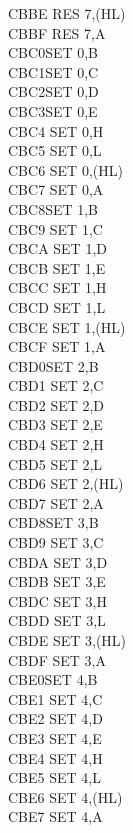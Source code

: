 \begin{multicols}{3}
{\begin{tabbing}
    CBBE\> 	RES 7,(HL)\\
    CBBF\> 	RES 7,A\\
    CBC0\>SET 0,B\\
    CBC1\>SET 0,C\\
    CBC2\>SET 0,D\\
    CBC3\>SET 0,E\\
    CBC4\> 	SET 0,H\\
    CBC5\> 	SET 0,L\\
    CBC6\> 	SET 0,(HL)\\
    CBC7\> 	SET 0,A\\
    CBC8\>SET 1,B\\
    CBC9\> 	SET 1,C\\
    CBCA\> 	SET 1,D\\
    CBCB\> 	SET 1,E\\
    CBCC\> 	SET 1,H\\
    CBCD\> 	SET 1,L\\
    CBCE\> 	SET 1,(HL)\\
    CBCF\> 	SET 1,A\\
    CBD0\>SET 2,B\\
    CBD1\> 	SET 2,C\\
    CBD2\> 	SET 2,D\\
    CBD3\> 	SET 2,E\\
    CBD4\> 	SET 2,H\\
    CBD5\> 	SET 2,L\\
    CBD6\> 	SET 2,(HL)\\
    CBD7\> 	SET 2,A\\
    CBD8\>SET 3,B\\
    CBD9\> 	SET 3,C\\
    CBDA\> 	SET 3,D\\
    CBDB\> 	SET 3,E\\
    CBDC\> 	SET 3,H\\
    CBDD\> 	SET 3,L\\
    CBDE\> 	SET 3,(HL)\\
    CBDF\> 	SET 3,A\\
    CBE0\>SET 4,B\\
    CBE1\> 	SET 4,C\\
    CBE2\> 	SET 4,D\\
    CBE3\> 	SET 4,E\\
    CBE4\> 	SET 4,H\\
    CBE5\> 	SET 4,L\\
    CBE6\> 	SET 4,(HL)\\
    CBE7\> 	SET 4,A\\

\end{tabbing}}
\end{multicols}
